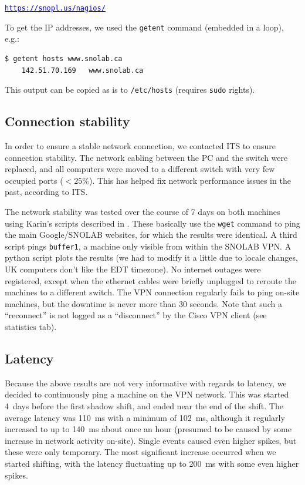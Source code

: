 \documentclass[a4paper,10pt]{article}
\newcommand{\link}[1]{\href{#1}{\textcolor{blue}{\texttt{#1}}}} %
\begin{document}
\qquad\link{https://snopl.us/nagios/}

To get the IP addresses, we used the {\tt getent} command (embedded in a loop), e.g.:
\begin{Verbatim}[xleftmargin=-8mm]
	$ getent hosts www.snolab.ca
	142.51.70.169   www.snolab.ca
\end{Verbatim}
This output can be copied as is to {\tt /etc/hosts} (requires {\tt sudo} rights).

\subsection{Connection stability}
In order to ensure a stable network connection, we contacted ITS to ensure connection stability. The network cabling between the PC and the switch were replaced, and all computers were moved to a different switch with very few occupied ports ($<25\%$). This has helped fix network performance issues in the past, according to ITS.

The network stability was tested over the course of 7 days on both machines using Karin's scripts described in \cite{doc5040}. These basically use the {\tt wget} command to ping the main Google/SNOLAB websites, for which the results were identical. A third script pings {\tt buffer1}, a machine only visible from within the SNOLAB VPN. A python script plots the results (we had to modify it a little due to locale changes, UK computers don't like the EDT timezone). No internet outages were registered, except when the ethernet cables were briefly unplugged to reroute the machines to a different switch. The VPN connection regularly fails to ping on-site machines, but the downtime is never more than 30 seconds. Note that such a ``reconnect'' is not logged as a ``disconnect'' by the Cisco VPN client (see statistics tab).

\subsection{Latency}
Because the above results are not very informative with regards to latency, we decided to continuously ping a machine on the VPN network. This was started 4~days before the first shadow shift, and ended near the end of the shift. The average latency was 110~ms with a minimum of 102~ms, although it regularly increased to up to 140~ms about once an hour (presumed to be caused by some increase in network activity on-site). Single events caused even higher spikes, but these were only temporary. The most significant increase occurred when we started shifting, with the latency fluctuating up to 200~ms with some even higher spikes.
\end{document}
